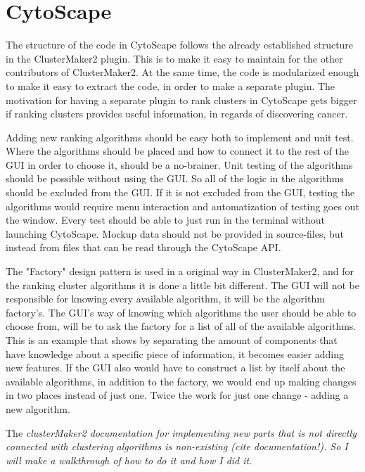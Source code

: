 \documentclass[UKenglish]{ifimaster}
\begin{document}
\part{CytoScape} %
The structure of the code in CytoScape follows the already established structure in the ClusterMaker2 plugin. This is to
make it easy to maintain for the other contributors of ClusterMaker2. At the same time, the code is modularized enough
to make it easy to extract the code, in order to make a separate plugin. The motivation for having a separate plugin to
rank clusters in CytoScape gets bigger if ranking clusters provides useful information, in regards of discovering
cancer.

Adding new ranking algorithms should be easy both to implement and unit test. Where the algorithms should be placed and
how to connect it to the rest of the GUI in order to choose it, should be a no-brainer. Unit testing of the algorithms
should be possible without using the GUI. So all of the logic in the algorithms should be excluded from the GUI. If it
is not excluded from the GUI, testing the algorithms would require menu interaction and automatization of testing goes
out the window. Every test should be able to just run in the terminal without launching CytoScape. Mockup data %
should not be provided in source-files, but instead from files that can be read through the CytoScape API. %

The "Factory" design pattern %
is used in a original way in ClusterMaker2, and for the ranking cluster algorithms it is done a little bit different.
The GUI will not be responsible for knowing every available algorithm, it will be the algorithm factory's. The GUI's way
of knowing which algorithms the user should be able to choose from, will be to ask the factory for a list of all of the
available algorithms. This is an example that shows by separating the amount of components that have knowledge about a
specific piece of information, it becomes easier adding new features. If the GUI also would have to construct a list by
itself about the available algorithms, in addition to the factory, we would end up making changes in two places instead
of just one. Twice the work for just one change - adding a new algorithm.


The \it{clusterMaker2} documentation for implementing new parts that is not directly connected with clustering
algorithms is non-existing (cite documentation!). So I will make a walkthrough of how to do it and how I did it.
\end{document}
